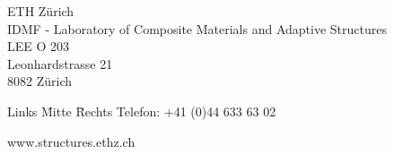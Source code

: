 {\begin{table}[!b]
	\end{table}
	\newpage
	\thispagestyle{empty}
	\vspace*{140mm}
	\begin{table}[!b]
	\begin{flushleft}
			{
			\renewcommand{\baselinestretch}{1}
			\small ETH Zürich\\
			\small IDMF - Laboratory of Composite Materials and Adaptive Structures\\
			\small LEE O 203\\
			\small Leonhardstrasse 21\\
			\small 8082 Zürich\\
			\begin{tabbing}
			Links \= Mitte \= Rechts \kill
			\small Telefon: \> \> +41 (0)44 633 63 02\\
			\end{tabbing}
			\small www.structures.ethz.ch\\
			}
	\end{flushleft}
	\end{table}
	\clearpage
}